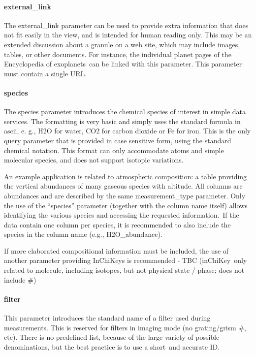 \documentclass[11pt,a4paper]{ivoa}
\begin{document}
\paragraph{external\_link}

The external\_link parameter can be used to provide extra information that does not fit easily in the view, and is intended for human reading only. This may be an extended discussion about a granule on a web site, which may include images, tables, or other documents. For instance, the individual planet pages of the Encyclopedia of exoplanets can be linked with this parameter. This parameter must contain a single URL.\\

\paragraph{species}

The species parameter introduces the chemical species of interest in simple data services. The formatting is very basic and simply uses the standard formula in ascii, e. g., H2O for water, CO2 for carbon dioxide or Fe for iron. This is the only query parameter that is provided in case sensitive form, using the standard chemical notation. This format can only accommodate atoms and simple molecular species, and does not support isotopic variations.  

An example application is related to atmospheric composition: a table providing the vertical abundances of many gaseous species with altitude. All columns are abundances and are described by the same measurement\_type parameter. Only the use of the ``species'' parameter (together with the column name itself) allows identifying the various species and accessing the requested information. If the data contain one column per species, it is recommended to also include the species in the column name (e.g., H2O\_abundance). 

If more elaborated compositional information must be included, the use of another parameter providing InChiKeys is recommended - TBC (inChiKey only related to molecule, including isotopes, but not physical state / phase; does not include \#)\\

\paragraph{filter}

This parameter introduces the standard name of a filter used during measurements. This is reserved for filters in imaging mode (no grating/grism \#, etc). There is no predefined list, because of the large variety of possible denominations, but the best practice is to use a short and accurate ID. 
\end{document}
